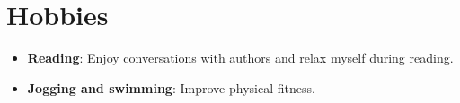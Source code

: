 \documentclass[letterpaper,11pt]{article}
\newcommand{\resumeItem}[2]{
  \item\small{
    \textbf{#1}{: #2 \vspace{-2pt}}
  }
}
\newcommand{\resumeSubItem}[2]{\resumeItem{#1}{#2}\vspace{-4pt}}
\newcommand{\resumeSubHeadingListStart}{\begin{itemize}[leftmargin=*]}
\newcommand{\resumeSubHeadingListEnd}{\end{itemize}}
\begin{document}
\section{Hobbies}
  \resumeSubHeadingListStart
    \resumeSubItem{Reading}
    {Enjoy conversations with authors and relax myself during reading.}
    \resumeSubItem{Jogging and swimming} 
    {Improve physical fitness. }
 \resumeSubHeadingListEnd


\end{document}

